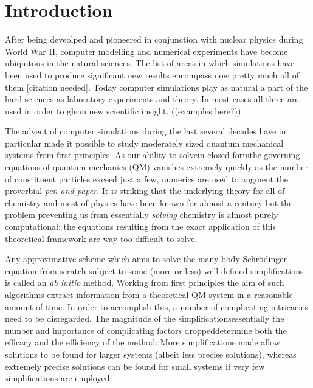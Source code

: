 \documentclass[twoside,english]{uiofysmaster}
\begin{document}
\tableofcontents

\chapter{Introduction}
After being deveolped and pioneered in conjunction with nuclear physics during World War II, computer modelling and numerical experiments have become ubiquitous in the natural sciences. The list of areas in which simulations have been used to produce significant new results encompass now pretty much all of them [citation needed]. Today computer simulations play as natural a part of the hard sciences as laboratory experiments and theory. In most cases all three are used in order to glean new scientific insight. ((examples here?))

The advent of computer simulations during the last several decades have in particular made it possible to study moderately sized quantum mechanical systems from first principles. As our ability to solve\textemdash in closed form\textemdash the governing equations of quantum mechanics (QM) vanishes extremely quickly as the number of constituent particles exceed just a few, numerics are used to augment the proverbial \emph{pen and paper}. It is striking that the underlying theory for all of chemistry and most of physics have been known for almost a century but the problem preventing us from essentially \emph{solving} chemistry is almost purely computational: the equations resulting from the exact application of this theoretical framework are way too difficult to solve.

Any approximative scheme which aims to solve the many-body Schrödinger equation from scratch subject to some (more or less) well-defined simplifications is called an \emph{ab initio} method. Working from first principles the aim of such algorithms extract information from a theoretical QM system in a reasonable amount of time. In order to accomplish this, a number of complicating intricacies need to be disregarded. The magnitude of the simplifications\textemdash essentially the number and importance of complicating factors dropped\textemdash determine both the efficacy and the efficiency of the method: More simplifications made allow solutions to be found for larger systems (albeit less precise solutions), whereas extremely precise solutions can be found for small systems if very few simplifications are employed.
\end{document}
